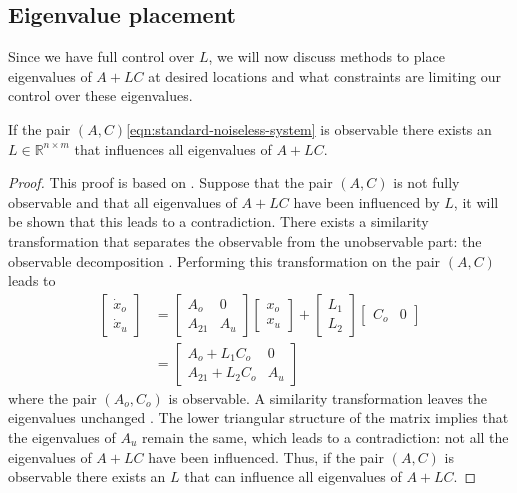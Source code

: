 \subsection{Eigenvalue placement}
Since we have full control over $L$, we will now discuss methods to place eigenvalues of $A+LC$ at desired locations and what constraints are limiting our control over these eigenvalues.

\begin{theorem}
\label{th:arbitrary-alc-eigenvalues}
    If the pair $(A,C)$\eqref{eqn:standard-noiseless-system} is observable there exists an $L \in \mathbb{R}^{n \times m}$ that influences all eigenvalues of $A+LC$.
\end{theorem}
\begin{proof}
    This proof is based on \cite[Section 4.2]{Antsaklis2006LinearProcessing}. Suppose that the pair $(A,C)$ is not fully observable and that all eigenvalues of $A+LC$  have been influenced by $L$, it will be shown that this leads to a contradiction. There exists a similarity transformation that separates the observable from the unobservable part: the observable decomposition \cite[Section 16.1]{Hespanha2018LinearTheory}. Performing this transformation on the pair $(A,C)$ leads to
    \begin{equation}
    \begin{split}
        \begin{bmatrix}
            \dot{x}_o \\
            \dot{x}_u
        \end{bmatrix}
        &=
        \begin{bmatrix}
            A_o & 0 \\
            A_{21} & A_u
        \end{bmatrix}
        \begin{bmatrix}
            x_o \\
            x_u
        \end{bmatrix}
        + 
        \begin{bmatrix}
            L_1 \\
            L_2
        \end{bmatrix}
        \begin{bmatrix}
            C_o & 0
        \end{bmatrix} \\
        &=
        \begin{bmatrix}
            A_o + L_1 C_o & 0 \\
            A_{21} + L_2 C_o & A_u
        \end{bmatrix}
    \end{split}
    \end{equation}  
where the pair $(A_o,C_o)$ is observable. A similarity transformation leaves the eigenvalues unchanged \cite[Section 5.2]{Lay2016LinearApplications}. The lower triangular structure of the matrix implies that the eigenvalues of $A_u$ remain the same, which leads to a contradiction: not all the eigenvalues of $A+LC$ have been influenced. Thus, if the pair $(A,C)$ is observable there exists an $L$ that can influence all eigenvalues of $A+LC$.
\end{proof}

